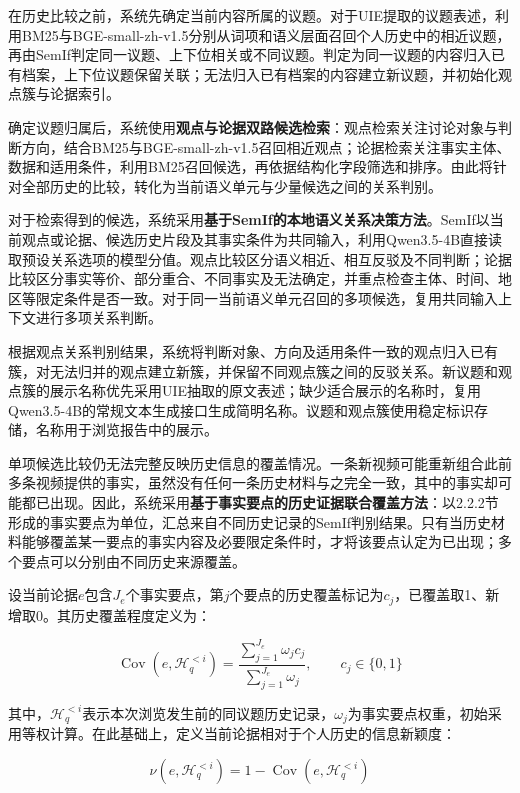 在历史比较之前，系统先确定当前内容所属的议题。对于UIE提取的议题表述，利用BM25与BGE-small-zh-v1.5分别从词项和语义层面召回个人历史中的相近议题，再由SemIf判定同一议题、上下位相关或不同议题。判定为同一议题的内容归入已有档案，上下位议题保留关联；无法归入已有档案的内容建立新议题，并初始化观点簇与论据索引。

确定议题归属后，系统使用\textbf{观点与论据双路候选检索}：观点检索关注讨论对象与判断方向，结合BM25与BGE-small-zh-v1.5召回相近观点；论据检索关注事实主体、数据和适用条件，利用BM25召回候选，再依据结构化字段筛选和排序。由此将针对全部历史的比较，转化为当前语义单元与少量候选之间的关系判别。

对于检索得到的候选，系统采用\textbf{基于SemIf的本地语义关系决策方法}。SemIf以当前观点或论据、候选历史片段及其事实条件为共同输入，利用Qwen3.5-4B直接读取预设关系选项的模型分值。观点比较区分语义相近、相互反驳及不同判断；论据比较区分事实等价、部分重合、不同事实及无法确定，并重点检查主体、时间、地区等限定条件是否一致。对于同一当前语义单元召回的多项候选，复用共同输入上下文进行多项关系判断。

根据观点关系判别结果，系统将判断对象、方向及适用条件一致的观点归入已有簇，对无法归并的观点建立新簇，并保留不同观点簇之间的反驳关系。新议题和观点簇的展示名称优先采用UIE抽取的原文表述；缺少适合展示的名称时，复用Qwen3.5-4B的常规文本生成接口生成简明名称。议题和观点簇使用稳定标识存储，名称用于浏览报告中的展示。

单项候选比较仍无法完整反映历史信息的覆盖情况。一条新视频可能重新组合此前多条视频提供的事实，虽然没有任何一条历史材料与之完全一致，其中的事实却可能都已出现。因此，系统采用\textbf{基于事实要点的历史证据联合覆盖方法}：以2.2.2节形成的事实要点为单位，汇总来自不同历史记录的SemIf判别结果。只有当历史材料能够覆盖某一要点的事实内容及必要限定条件时，才将该要点认定为已出现；多个要点可以分别由不同历史来源覆盖。

设当前论据\(e\)包含\(J_e\)个事实要点，第\(j\)个要点的历史覆盖标记为\(c_j\)，已覆盖取1、新增取0。其历史覆盖程度定义为：

\begin{equation}
\operatorname{Cov}(e,\mathcal H_q^{<i})=\frac{\sum_{j=1}^{J_e}\omega_jc_j}{\sum_{j=1}^{J_e}\omega_j},\qquad c_j\in\{0,1\}
\label{eq:2-1}
\end{equation}

其中，\(\mathcal H_q^{<i}\)表示本次浏览发生前的同议题历史记录，\(\omega_j\)为事实要点权重，初始采用等权计算。在此基础上，定义当前论据相对于个人历史的信息新颖度：

\begin{equation}
\nu(e,\mathcal H_q^{<i})=1-\operatorname{Cov}(e,\mathcal H_q^{<i})
\label{eq:2-2}
\end{equation}

